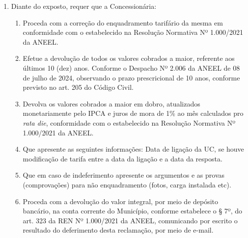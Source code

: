 \begin{enumerate}[resume]
\item 
Diante do exposto, requer que a Concessionária:

\begin{enumerate}
\item 
Proceda com a correção do enquadramento tarifário da mesma em conformidade com o estabelecido na Resolução Normativa Nº 1.000/2021 da ANEEL.
\item 
Efetue a devolução de todos os valores cobrados a maior, referente aos últimos 10 (dez) anos. Conforme o Despacho Nº 2.006 da ANEEL de 08 de julho de 2024, observando o prazo prescricional de 10 anos, conforme previsto no art. 205 do Código Civil.
\item 
Devolva os valores cobrados a maior em dobro, atualizados monetariamente pelo IPCA e juros de mora de 1\% ao mês calculados pro \textit{rata die}, conformidade com o estabelecido na Resolução Normativa Nº 1.000/2021 da ANEEL.   
\item 
Que apresente as seguintes informações: Data de ligação da UC, se houve modificação de tarifa entre a data da ligação e a data da resposta.   
\item 
Que em caso de indeferimento apresente os argumentos e as provas (comprovações) para não enquadramento (fotos, carga instalada etc).   
\item 
Proceda com a devolução do valor integral, por meio de depósito bancário, na conta corrente do Município, conforme estabelece o § 7º, do art. 323 da REN Nº 1.000/2021 da ANEEL, comunicando por escrito o resultado do deferimento desta reclamação, por meio de e-mail.

\end{enumerate}
\end{enumerate}